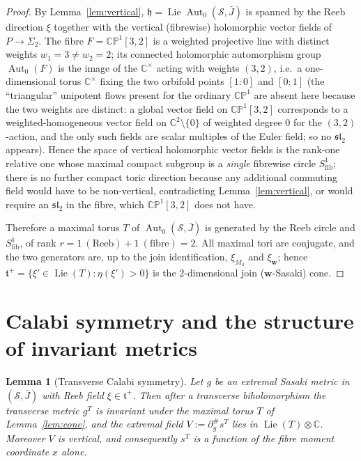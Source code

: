 \documentclass{amsart}
\newtheorem{lemma}{Lemma}
\theoremstyle{definition}
\DeclareMathOperator{\Aut}{Aut}
\DeclareMathOperator{\Lie}{Lie}
\begin{document}
\begin{proof}
By Lemma~\ref{lem:vertical}, $\mathfrak h=\Lie\Aut_0(\mathcal S,\bar J)$ is
spanned by the Reeb direction $\xi$ together with the vertical (fibrewise)
holomorphic vector fields of $P\to\Sigma_2$. The fibre $F=\mathbb{CP}^1[3,2]$ is
a weighted projective line with distinct weights $w_1=3\neq w_2=2$; its
connected holomorphic automorphism group $\Aut_0(F)$ is the image of the
$\mathbb C^\times$ acting with weights $(3,2)$, i.e.\ a one-dimensional torus
$\mathbb C^\times$ fixing the two orbifold points $[1:0]$ and $[0:1]$ (the
``triangular'' unipotent flows present for the ordinary $\mathbb{CP}^1$ are
absent here because the two weights are distinct: a global vector field on
$\mathbb{CP}^1[3,2]$ corresponds to a weighted-homogeneous vector field on
$\mathbb C^2\setminus\{0\}$ of weighted degree $0$ for the $(3,2)$-action, and
the only such fields are scalar multiples of the Euler field; so no
$\mathfrak{sl}_2$ appears). Hence the space of vertical holomorphic vector
fields is the rank-one relative one whose maximal compact subgroup is a
\emph{single} fibrewise circle $S^1_{\mathrm{fib}}$; there is no further compact
toric direction because any additional commuting field would have to be
non-vertical, contradicting Lemma~\ref{lem:vertical}, or would require an
$\mathfrak{sl}_2$ in the fibre, which $\mathbb{CP}^1[3,2]$ does not have.

Therefore a maximal torus $T$ of $\Aut_0(\mathcal S,\bar J)$ is generated by the
Reeb circle and $S^1_{\mathrm{fib}}$, of rank
$r = 1\ (\text{Reeb}) + 1\ (\text{fibre}) = 2$.
All maximal tori are conjugate, and the two generators are, up to the join
identification, $\xi_{M_3}$ and $\xi_{\mathbf w}$; hence
$\mathfrak t^+=\{\xi'\in\Lie(T):\eta(\xi')>0\}$ is the $2$-dimensional join
($\mathbf w$-Sasaki) cone.
\end{proof}

\section{Calabi symmetry and the structure of invariant metrics}

\begin{lemma}[Transverse Calabi symmetry]\label{lem:average}
Let $g$ be an extremal Sasaki metric in $(\mathcal S,\bar J)$ with Reeb field
$\xi\in\mathfrak t^+$. Then after a transverse biholomorphism the transverse
metric $g^T$ is invariant under the maximal torus $T$ of Lemma~\ref{lem:cone},
and the extremal field $V:=\partial^\#_g s^T$ lies in $\Lie(T)\otimes\mathbb C$.
Moreover $V$ is \emph{vertical}, and consequently $s^T$ is a function of the
fibre moment coordinate $x$ alone.
\end{lemma}
\end{document}
